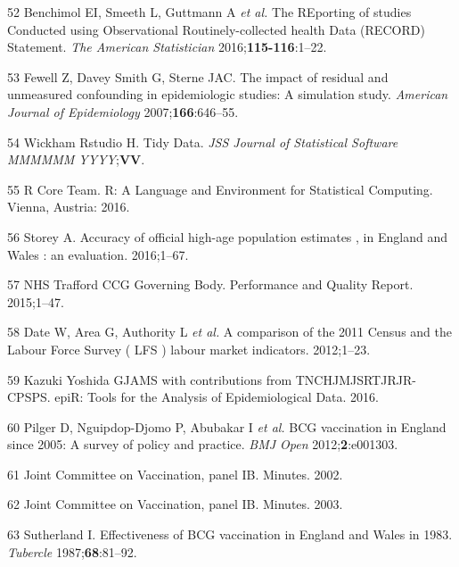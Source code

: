\documentclass[11pt,twoside]{bristolthesis}
\begin{document}
  \leavevmode\hypertarget{ref-Benchimol2016a}{}%
  52 Benchimol EI, Smeeth L, Guttmann A \emph{et al.} The REporting of studies Conducted using Observational Routinely-collected health Data (RECORD) Statement. \emph{The American Statistician} 2016;\textbf{115-116}:1--22.
  
  \leavevmode\hypertarget{ref-Fewell2007}{}%
  53 Fewell Z, Davey Smith G, Sterne JAC. The impact of residual and unmeasured confounding in epidemiologic studies: A simulation study. \emph{American Journal of Epidemiology} 2007;\textbf{166}:646--55.
  
  \leavevmode\hypertarget{ref-Wickham2015}{}%
  54 Wickham Rstudio H. Tidy Data. \emph{JSS Journal of Statistical Software MMMMMM YYYY};\textbf{VV}.
  
  \leavevmode\hypertarget{ref-R}{}%
  55 R Core Team. R: A Language and Environment for Statistical Computing. Vienna, Austria: 2016.
  
  \leavevmode\hypertarget{ref-storey2016}{}%
  56 Storey A. Accuracy of official high-age population estimates , in England and Wales : an evaluation. 2016;1--67.
  
  \leavevmode\hypertarget{ref-NHSTraffordCCGGoverningBody2015}{}%
  57 NHS Trafford CCG Governing Body. Performance and Quality Report. 2015;1--47.
  
  \leavevmode\hypertarget{ref-Date2012}{}%
  58 Date W, Area G, Authority L \emph{et al.} A comparison of the 2011 Census and the Labour Force Survey ( LFS ) labour market indicators. 2012;1--23.
  
  \leavevmode\hypertarget{ref-Stevenson2016}{}%
  59 Kazuki Yoshida GJAMS with contributions from TNCHJMJSRTJRJR-CPSPS. epiR: Tools for the Analysis of Epidemiological Data. 2016.
  
  \leavevmode\hypertarget{ref-Pilger2012b}{}%
  60 Pilger D, Nguipdop-Djomo P, Abubakar I \emph{et al.} BCG vaccination in England since 2005: A survey of policy and practice. \emph{BMJ Open} 2012;\textbf{2}:e001303.
  
  \leavevmode\hypertarget{ref-JVCIBCG2002}{}%
  61 Joint Committee on Vaccination, panel IB. Minutes. 2002.
  
  \leavevmode\hypertarget{ref-JVCIBCG2003}{}%
  62 Joint Committee on Vaccination, panel IB. Minutes. 2003.
  
  \leavevmode\hypertarget{ref-Sutherland1987a}{}%
  63 Sutherland I. Effectiveness of BCG vaccination in England and Wales in 1983. \emph{Tubercle} 1987;\textbf{68}:81--92.
  
\end{document}
